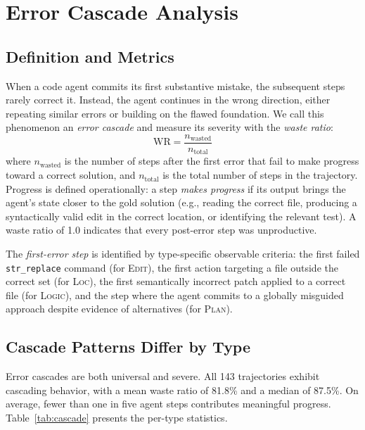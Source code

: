 \documentclass[11pt]{article}
\begin{document}
\section{Error Cascade Analysis}
\label{sec:cascade}

\subsection{Definition and Metrics}

When a code agent commits its first substantive mistake, the subsequent steps rarely correct it.
Instead, the agent continues in the wrong direction, either repeating similar errors or building on the flawed foundation.
We call this phenomenon an \textit{error cascade} and measure its severity with the \textit{waste ratio}:
\begin{equation}
\text{WR} = \frac{n_{\text{wasted}}}{n_{\text{total}}}
\label{eq:waste}
\end{equation}
where $n_{\text{wasted}}$ is the number of steps after the first error that fail to make progress toward a correct solution, and $n_{\text{total}}$ is the total number of steps in the trajectory.
Progress is defined operationally: a step \textit{makes progress} if its output brings the agent's state closer to the gold solution (e.g., reading the correct file, producing a syntactically valid edit in the correct location, or identifying the relevant test).
A waste ratio of 1.0 indicates that every post-error step was unproductive.

The \textit{first-error step} is identified by type-specific observable criteria: the first failed \texttt{str\_replace} command (for \textsc{Edit}), the first action targeting a file outside the correct set (for \textsc{Loc}), the first semantically incorrect patch applied to a correct file (for \textsc{Logic}), and the step where the agent commits to a globally misguided approach despite evidence of alternatives (for \textsc{Plan}).

\subsection{Cascade Patterns Differ by Type}

Error cascades are both universal and severe.
All 143 trajectories exhibit cascading behavior, with a mean waste ratio of 81.8\% and a median of 87.5\%.
On average, fewer than one in five agent steps contributes meaningful progress.
Table~\ref{tab:cascade} presents the per-type statistics.
\end{document}
